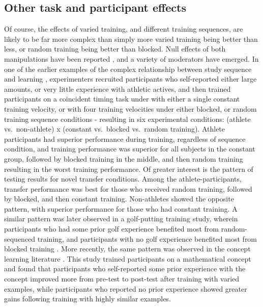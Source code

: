 \documentclass[
  12pt,
  letterpaper,
]{article}
\begin{document}
\subsection{Other task and participant
effects}\label{other-task-and-participant-effects}

Of course, the effects of varied training, and different training
sequences, are likely to be far more complex than simply more varied
training being better than less, or random training being better than
blocked. Null effects of both manipulations have been reported
\autocites[see][]{magillReviewContextualInterference1990}[ for
reviews]{vanrossumSchmidtSchemaTheory1990}, and a variety of moderators
have emerged. In one of the earlier examples of the complex relationship
between study sequence and learning
\autocite{delreyEffectsContextualInterference1982}, experimenters
recruited participants who self-reported either large amounts, or very
little experience with athletic actives, and then trained participants
on a coincident timing task under with either a single constant training
velocity, or with four training velocities under either blocked, or
random training sequence conditions - resulting in six experimental
conditions: (athlete vs.~non-athlete) x (constant vs.~blocked vs.~random
training). Athlete participants had superior performance during
training, regardless of sequence condition, and training performance was
superior for all subjects in the constant group, followed by blocked
training in the middle, and then random training resulting in the worst
training performance. Of greater interest is the pattern of testing
results for novel transfer conditions. Among the athlete-participants,
transfer performance was best for those who received random training,
followed by blocked, and then constant training. Non-athletes showed the
opposite pattern, with superior performance for those who had constant
training. A similar pattern was later observed in a golf-putting
training study, wherein participants who had some prior golf experience
benefited most from random-sequenced training, and participants with no
golf experience benefited most from blocked training
\autocite{guadagnoliRelationshipContextualInterference1999}. More
recently, the same pattern was observed in the concept learning
literature \autocite[ expt 1.]{braithwaiteEffectsVariationPrior2015}.
This study trained participants on a mathematical concept and found that
participants who self-reported some prior experience with the concept
improved more from pre-test to post-test after training with varied
examples, while participants who reported no prior experience showed
greater gains following training with highly similar examples.
\end{document}
